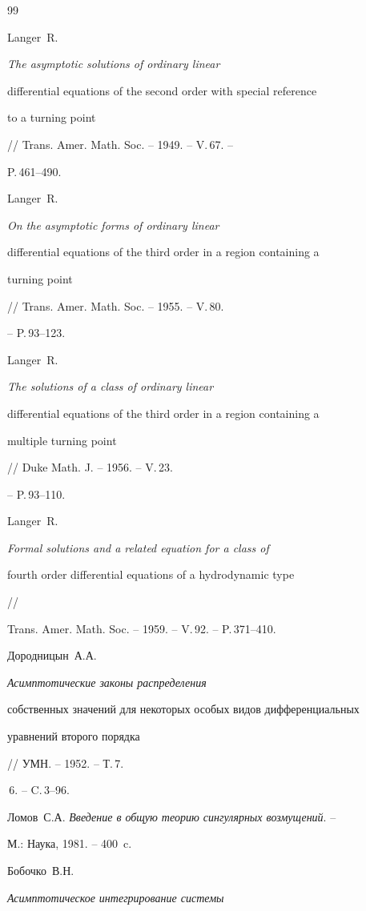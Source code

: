 \begin{thebibliography}{99}







Langer~R. {\it The asymptotic solutions of ordinary linear


differential equations of the second order with special reference


to a turning point} // Trans. Amer. Math. Soc. -- 1949. -- V.\,67. --


P.\,461--490.




Langer~R. {\it On the asymptotic forms of ordinary linear


differential equations of the third order in a region containing a


turning point} // Trans. Amer. Math. Soc. -- 1955. -- V.\,80.


-- P.\,93--123.




Langer~R. {\it The solutions of a class of ordinary linear


differential equations of the third order in a region containing a


multiple turning point} // Duke Math. J. -- 1956. -- V.\,23.


-- P.\,93--110.




Langer~R. {\it Formal solutions and a related equation for a class of


fourth order differential equations of a hydrodynamic type} //


Trans. Amer. Math. Soc. -- 1959. -- V.\,92. -- P.\,371--410.




Дородницын~А.А. {\it Асимптотические законы распределения


собственных значений для некоторых особых видов дифференциальных


уравнений второго порядка} // УМН. -- 1952. -- Т.\,7.


\No\,6. -- C.\,3--96.




Ломов~С.А. {\it Введение в общую теорию сингулярных возмущений}. --


М.: Наука, 1981. -- 400~c.




Бобочко~В.Н. {\it Асимптотическое интегрирование системы


}
\end{thebibliography}
